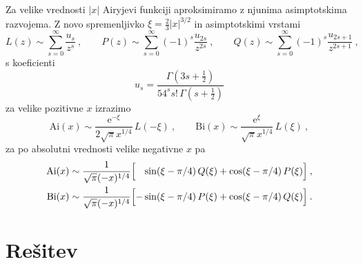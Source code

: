 \documentclass{article}
\newcommand{\Ai}{\mathrm{Ai}}
\newcommand{\Bi}{\mathrm{Bi}}
\begin{document}
Za velike vrednosti $|x|$ Airyjevi funkciji aproksimiramo
z njunima asimp\-tot\-ski\-ma razvojema.  Z novo spremenljivko
$\xi=\frac{2}{3} |x|^{3/2}$ in asimptotskimi vrstami
%
\begin{equation*}
  L(z) \sim \sum_{s=0}^\infty \frac{u_s}{z^s}\>,\qquad
  P(z) \sim \sum_{s=0}^\infty (-1)^s \frac{u_{2s}}{z^{2 s}}\>,\qquad
  Q(z) \sim \sum_{s=0}^\infty (-1)^s \frac{u_{2s+1}}{z^{2 s+1}}\>,
\end{equation*}
s koeficienti
\begin{equation*}
u_s = \frac{ \Gamma(3s + \frac{1}{2})}
        {54^s s!\, \Gamma(s + \frac{1}{2}) }
\end{equation*}
za velike pozitivne $x$ izrazimo
%
\begin{equation*}
\Ai(x)\sim  \frac{\mathrm{e}^{-\xi}}{2\sqrt{\pi} x^{1/4}} \, L(-\xi) \>, \qquad
\Bi(x)\sim  \frac{\mathrm{e}^{\xi}} { \sqrt{\pi} x^{1/4}} \, L(\xi)\>,
\end{equation*}
%
za po absolutni vrednosti velike negativne $x$ pa
%
%
\begin{align*}
    \Ai(x)&\sim  \frac{1}{\sqrt{\pi} (-x)^{1/4}}
    \Bigl[ \phantom{-}\sin(\xi-\pi/4) \, Q(\xi)
                    + \cos(\xi-\pi/4) \, P(\xi)\Bigr] \>, \\
    \Bi(x)&\sim  \frac{1}{\sqrt{\pi} (-x)^{1/4}}
    \Bigl[ - \sin(\xi-\pi/4) \, P(\xi)
      + \cos(\xi-\pi/4) \, Q(\xi)\Bigr]\>.
\end{align*}
\newpage
\section{Rešitev}
\end{document}
